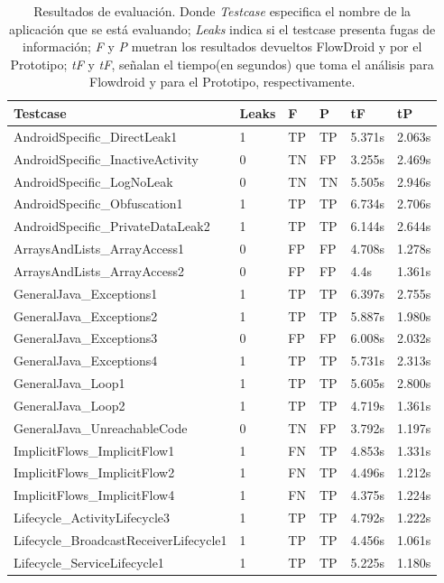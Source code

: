 \begin{table}[H]
\begin{center}
\small\addtolength{\tabcolsep}{-3pt}
\caption{Resultados de evaluación. Donde
\textit{Testcase} especifica el nombre de la aplicación que se está evaluando;
\textit{Leaks} indica si el testcase presenta fugas de información;
\textit{F} y  \textit{P} muetran los resultados devueltos FlowDroid y por el
Prototipo; \textit{tF} y \textit{tF}, señalan el tiempo(en segundos) que toma el
análisis para Flowdroid y para el Prototipo, respectivamente.}
\label{tb:resultados}
\begin{tabular}{|p{6cm}|p{1cm}|p{1cm}|p{1cm}|p{1cm}|p{1cm}|}
	\hline
	\textbf{Testcase} & \textbf{Leaks} & \textbf{F} &
	\textbf{P} & \textbf{ tF} & 
	\textbf{tP}\\
	\hline
	AndroidSpecific\_DirectLeak1 & 1 & TP & TP &5.371s &2.063s\\
	\hline
	AndroidSpecific\_InactiveActivity & 0 & TN & FP  &3.255s &2.469s\\
	\hline
	AndroidSpecific\_LogNoLeak & 0 & TN & TN &5.505s &2.946s\\
	\hline
	AndroidSpecific\_Obfuscation1 & 1 & TP & TP &6.734s &2.706s\\
	\hline
	 AndroidSpecific\_PrivateDataLeak2 & 1 & TP & TP & 6.144s &2.644s\\
	\hline
	 ArraysAndLists\_ArrayAccess1 & 0 & FP & FP & 4.708s & 1.278s\\
	\hline
	 ArraysAndLists\_ArrayAccess2 & 0 & FP & FP & 4.4s &1.361s\\
	 \hline
	 GeneralJava\_Exceptions1 & 1 & TP & TP &6.397s &2.755s\\
	\hline
	 GeneralJava\_Exceptions2 & 1 & TP & TP &5.887s &1.980s\\
	\hline
	GeneralJava\_Exceptions3 & 0 & FP & FP &6.008s &2.032s\\
	\hline
	GeneralJava\_Exceptions4 & 1 & TP & TP &5.731s &2.313s\\
	\hline
	GeneralJava\_Loop1 & 1 & TP & TP &5.605s &2.800s\\
	\hline
	GeneralJava\_Loop2 & 1 & TP & TP &4.719s &1.361s\\
	\hline
	GeneralJava\_UnreachableCode & 0 & TN & FP &3.792s &1.197s\\
	\hline
	ImplicitFlows\_ImplicitFlow1 & 1 & FN & TP &4.853s &1.331s\\
	\hline
	ImplicitFlows\_ImplicitFlow2 & 1 & FN & TP &4.496s &1.212s\\
	\hline
	ImplicitFlows\_ImplicitFlow4 & 1 & FN & TP &4.375s &1.224s\\
	\hline
	Lifecycle\_ActivityLifecycle3 & 1 & TP & TP &4.792s &1.222s\\
	\hline
	Lifecycle\_BroadcastReceiverLifecycle1 & 1 & TP & TP &4.456s &1.061s\\
	\hline
	Lifecycle\_ServiceLifecycle1 & 1 & TP & TP &5.225s &1.180s\\
	\hline
\end{tabular}
\end{center}
\end{table}

